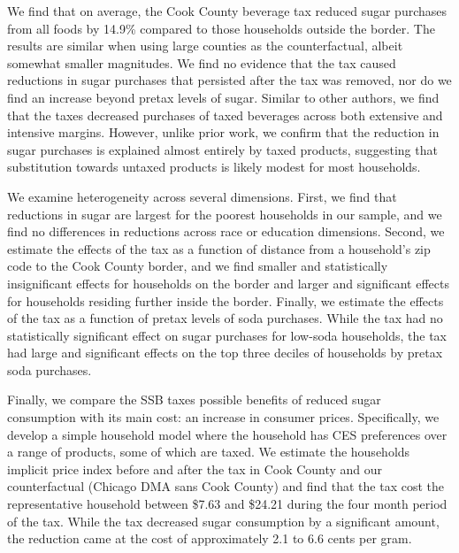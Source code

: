 \documentclass[12pt]{article}
\begin{document}
We find that on average, the Cook County beverage tax reduced sugar purchases from all foods by 14.9\% compared to those households outside the border. The results are similar when using large counties as the counterfactual, albeit somewhat smaller magnitudes. We find no evidence that the tax caused reductions in sugar purchases that persisted after the tax was removed, nor do we find an increase beyond pretax levels of sugar. Similar to other authors, we find that the taxes decreased purchases of taxed beverages across both extensive and intensive margins. However, unlike prior work, we confirm that the reduction in sugar purchases is explained almost entirely by taxed products, suggesting that substitution towards untaxed products is likely modest for most households.

We examine heterogeneity across several dimensions. First, we find that reductions in sugar are largest for the poorest households in our sample, and we find no differences in reductions across race or education dimensions. Second, we estimate the effects of the tax as a function of distance from a household's zip code to the Cook County border, and we find smaller and statistically insignificant effects for households on the border and larger and significant effects for households residing further inside the border. Finally, we estimate the effects of the tax as a function of pretax levels of soda purchases. While the tax had no statistically significant effect on sugar purchases for low-soda households, the tax had large and significant effects on the top three deciles of households by pretax soda purchases.

Finally, we compare the SSB taxes possible benefits of reduced sugar consumption with its main cost: an increase in consumer prices. Specifically, we develop a simple household model where the household has CES preferences over a range of products, some of which are taxed. We estimate the households implicit price index before and after the tax in Cook County and our counterfactual (Chicago DMA sans Cook County) and find that the tax cost the representative household between \$7.63 and \$24.21 during the four month period of the tax. While the tax decreased sugar consumption by a significant amount, the reduction came at the cost of approximately 2.1 to 6.6 cents per gram.
\end{document}
